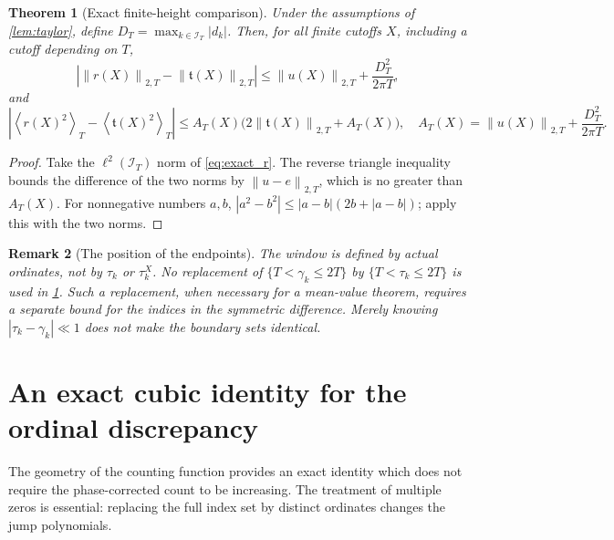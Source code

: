 \documentclass[11pt,reqno]{amsart}
\numberwithin{equation}{section}
\newtheorem{theorem}{Theorem}[section]
\newtheorem{remark}[theorem]{Remark}
\newcommand{\av}[1]{\left\langle #1\right\rangle_T}
\newcommand{\norm}[1]{\left\|#1\right\|_{2,T}}
\newcommand{\calI}{\mathcal I_T}
\begin{document}
\begin{theorem}[Exact finite-height comparison]\label{thm:finite}
Under the assumptions of \cref{lem:taylor}, define $D_T=\max_{k\in\calI}|d_k|$. Then, for all finite cutoffs $X$, including a cutoff depending on $T$,
\begin{equation}\label{eq:norm_cmp}
\left|\norm{r(X)}-\norm{\mathfrak t(X)}\right|
\le\norm{u(X)}+\frac{D_T^2}{2\pi T},
\end{equation}
and
\begin{equation}\label{eq:square_cmp}
\left|\av{r(X)^2}-\av{\mathfrak t(X)^2}\right|
\le A_T(X)\bigl(2\norm{\mathfrak t(X)}+A_T(X)\bigr),
\quad A_T(X)=\norm{u(X)}+\frac{D_T^2}{2\pi T}.
\end{equation}
\end{theorem}
\begin{proof}
Take the $\ell^2(\calI)$ norm of \eqref{eq:exact_r}. The reverse triangle inequality bounds the difference of the two norms by $\norm{u-e}$, which is no greater than $A_T(X)$. For nonnegative numbers $a,b$, $|a^2-b^2|\le|a-b|(2b+|a-b|)$; apply this with the two norms.
\end{proof}

\begin{remark}[The position of the endpoints]
The window is defined by actual ordinates, not by $\tau_k$ or $\tau_k^X$. No replacement of $\{T<\gamma_k\le2T\}$ by $\{T<\tau_k\le2T\}$ is used in \cref{thm:finite}. Such a replacement, when necessary for a mean-value theorem, requires a separate bound for the indices in the symmetric difference. Merely knowing $|\tau_k-\gamma_k|\ll1$ does not make the boundary sets identical.
\end{remark}


\section{An exact cubic identity for the ordinal discrepancy}\label{sec:cubic}
The geometry of the counting function provides an exact identity which does
not require the phase-corrected count to be increasing.  The treatment of
multiple zeros is essential: replacing the full index set by distinct
ordinates changes the jump polynomials.
\end{document}
